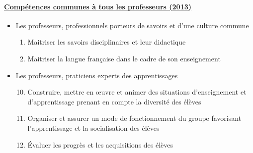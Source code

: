 \documentclass[10pt,french,twocolumn,landscape,a4paper]{article}
\begin{document}
\renewcommand{\theenumi}{P\arabic{enumi}}
\paragraph{\href{http://www.education.gouv.fr/pid25535/bulletin_officiel.html?cid_bo=73066}{Compétences communes à tous les professeurs (2013)}}
\begin{itemize}
\item Les professeurs, professionnels porteurs de savoirs et d'une culture commune
	\begin{enumerate}
	\item Maitriser les savoirs disciplinaires et leur didactique
	\item Maitriser la langue française dans le cadre de son enseignement
	\end{enumerate}
\item Les professeurs, praticiens experts des apprentissages
	\begin{enumerate}\setcounter{enumi}{9}
	\item Construire, mettre en œuvre et animer des situations d’enseignement et d’apprentissage prenant en compte la diversité des élèves
	\item Organiser et assurer un mode de fonctionnement du groupe favorisant l’apprentissage et la socialisation des élèves
	\item Évaluer les progrès et les acquisitions des élèves
	\end{enumerate}
\end{itemize}
\renewcommand{\theenumi}{\arabic{enumi}}
\end{document}
